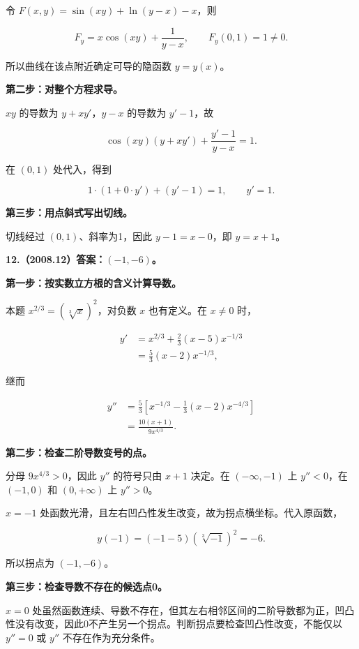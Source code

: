 \documentclass[UTF8,11pt,fontset=windows]{ctexart}
\begin{document}
令 $F(x,y)=\sin(xy)+\ln(y-x)-x$，则

$$
F_y=x\cos(xy)+\frac1{y-x},
\qquad F_y(0,1)=1\ne0.
$$

所以曲线在该点附近确定可导的隐函数 $y=y(x)$。

\textbf{第二步：对整个方程求导。}

$xy$ 的导数为 $y+xy'$，$y-x$ 的导数为 $y'-1$，故

$$
\cos(xy)(y+xy')+\frac{y'-1}{y-x}=1.
$$

在 $(0,1)$ 处代入，得到

$$
1\cdot(1+0\cdot y')+(y'-1)=1,
\qquad y'=1.
$$

\textbf{第三步：用点斜式写出切线。}

切线经过 $(0,1)$、斜率为1，因此 $y-1=x-0$，即 $\boxed{y=x+1}$。

\clearpage

\textbf{12.（2008.12）答案：$(-1,-6)$。}

\textbf{第一步：按实数立方根的含义计算导数。}

本题 $x^{2/3}=(\sqrt[3]x)^2$，对负数 $x$ 也有定义。在 $x\ne0$ 时，

$$
\begin{aligned}
y'&=x^{2/3}+\frac23(x-5)x^{-1/3}\\
&=\frac53(x-2)x^{-1/3},
\end{aligned}
$$

继而

$$
\begin{aligned}
y''&=\frac53\left[x^{-1/3}-\frac13(x-2)x^{-4/3}\right]\\
&=\frac{10(x+1)}{9x^{4/3}}.
\end{aligned}
$$

\textbf{第二步：检查二阶导数变号的点。}

分母 $9x^{4/3}>0$，因此 $y''$ 的符号只由 $x+1$ 决定。在 $(-\infty,-1)$ 上 $y''<0$，在 $(-1,0)$ 和 $(0,+\infty)$ 上 $y''>0$。

$x=-1$ 处函数光滑，且左右凹凸性发生改变，故为拐点横坐标。代入原函数，

$$
y(-1)=(-1-5)(\sqrt[3]{-1})^2=-6.
$$

所以拐点为 $\boxed{(-1,-6)}$。

\textbf{第三步：检查导数不存在的候选点0。}

$x=0$ 处虽然函数连续、导数不存在，但其左右相邻区间的二阶导数都为正，凹凸性没有改变，因此0不产生另一个拐点。判断拐点要检查凹凸性改变，不能仅以 $y''=0$ 或 $y''$ 不存在作为充分条件。
\end{document}
